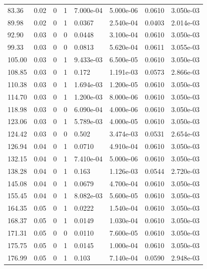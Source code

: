 \documentclass[preview]{standalone}
\begin{document}
{{\begin{tabular}{L{1.2cm}C{1.2cm} C{0.3cm}C{0.5cm} C{1.4cm}C{1.4cm} C{1.4cm}C{1.4cm}}
  83.36  &  0.02  & 0     &  1 &  7.000e-04  & 5.000e-06  & 0.0610 &  3.050e-03   \\ 
  89.98  &  0.02  & 0     &  1 &  0.0367  & 2.540e-04  & 0.0403 &  2.014e-03   \\ 
  92.90  &  0.03  & 0     &  0 &  0.0448  & 3.100e-04  & 0.0610 &  3.050e-03   \\ 
  99.33  &  0.03  & 0     &  0 &  0.0813  & 5.620e-04  & 0.0611 &  3.055e-03   \\ 
  105.00  &  0.03  & 0     &  1 &  9.433e-03  & 6.500e-05  & 0.0610 &  3.050e-03   \\ 
  108.85  &  0.03  & 0     &  1 &  0.172  & 1.191e-03  & 0.0573 &  2.866e-03   \\ 
  110.38  &  0.03  & 0     &  1 &  1.694e-03  & 1.200e-05  & 0.0610 &  3.050e-03   \\ 
  114.70  &  0.03  & 0     &  1 &  1.200e-03  & 8.000e-06  & 0.0610 &  3.050e-03   \\ 
  118.98  &  0.03  & 0     &  0 &  6.090e-04  & 4.000e-06  & 0.0610 &  3.050e-03   \\ 
  123.06  &  0.03  & 0     &  1 &  5.789e-03  & 4.000e-05  & 0.0610 &  3.050e-03   \\ 
  124.42  &  0.03  & 0     &  0 &  0.502  & 3.474e-03  & 0.0531 &  2.654e-03   \\ 
  126.94  &  0.04  & 0     &  1 &  0.0710  & 4.910e-04  & 0.0610 &  3.050e-03   \\ 
  132.15  &  0.04  & 0     &  1 &  7.410e-04  & 5.000e-06  & 0.0610 &  3.050e-03   \\ 
  138.28  &  0.04  & 0     &  1 &  0.163  & 1.126e-03  & 0.0544 &  2.720e-03   \\ 
  145.08  &  0.04  & 0     &  1 &  0.0679  & 4.700e-04  & 0.0610 &  3.050e-03   \\ 
  155.45  &  0.04  & 0     &  1 &  8.082e-03  & 5.600e-05  & 0.0610 &  3.050e-03   \\ 
  164.35  &  0.05  & 0     &  1 &  0.0222  & 1.540e-04  & 0.0610 &  3.050e-03   \\ 
  168.37  &  0.05  & 0     &  1 &  0.0149  & 1.030e-04  & 0.0610 &  3.050e-03   \\ 
  171.31  &  0.05  & 0     &  0 &  0.0110  & 7.600e-05  & 0.0610 &  3.050e-03   \\ 
  175.75  &  0.05  & 0     &  1 &  0.0145  & 1.000e-04  & 0.0610 &  3.050e-03   \\ 
  176.99  &  0.05  & 0     &  1 &  0.103  & 7.140e-04  & 0.0590 &  2.948e-03   \\ 

\end{tabular}}}
\end{document}
